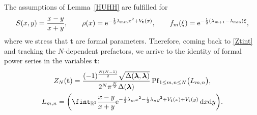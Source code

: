 \documentclass[pdftex]{sigma}
\numberwithin{equation}{section}
\newcommand{\dd}{\mathrm{d}}
\begin{document}
The assumptions of Lemma~\ref{HUHH} are fulfilled for
\[
S(x,y) = \frac{x - y}{x + y},\qquad \rho(x) = {\rm e}^{-\frac{1}{2}\lambda_{\min} x^2 + V_{\mathbf{t}}(x)},\qquad f_m(\xi) = {\rm e}^{-\frac{1}{2}(\lambda_{m+1} - \lambda_{\min})\xi},
\]
where we stress that $\mathbf{t}$ are formal parameters. Therefore, coming back to \eqref{Ztint} and tracking the $N$-dependent prefactors, we arrive to the identity of formal power series in the variables $\mathbf{t}$:
\begin{gather*}
Z_N(\mathbf{t}) = \frac{(-1)^{\frac{N(N - 1)}{2}} \sqrt{\Delta(\boldsymbol{\lambda},\boldsymbol{\lambda})}}{2^N \pi^{\frac{N}{2}} \Delta(\boldsymbol{\lambda})} \operatorname{Pf}_{1 \leq m,n \leq N} \bigl(L_{m,n}\bigr), \\
L_{m,n} = \biggl(\fint_{\mathbb{R}^2} \frac{x - y}{x + y} {\rm e}^{-\frac{1}{2}\lambda_m x^2 - \frac{1}{2}\lambda_n y^2 + V_{\mathbf{t}}(x) + V_{\mathbf{t}}(y)} \,\dd x \dd y\biggr).%
\end{gather*}
\end{document}
